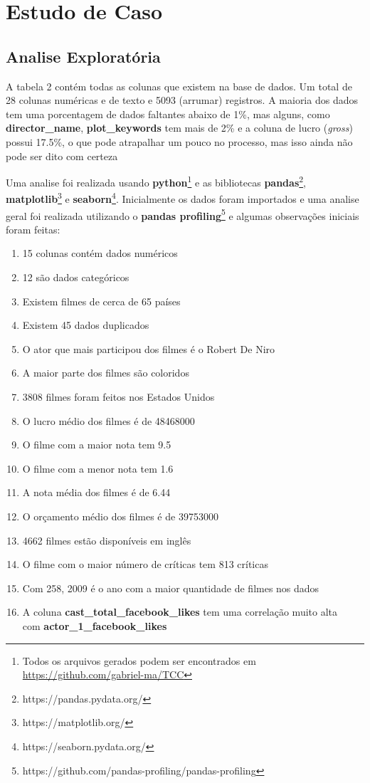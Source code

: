 \section{Estudo de Caso}
\subsection{Analise Exploratória}
A tabela 2 contém todas as colunas que existem na base de dados. Um total de 28 colunas numéricas e de texto e 5093 (arrumar) registros. A maioria dos dados tem uma porcentagem de dados faltantes abaixo de 1\%, mas alguns, como \textbf{director\_name}, \textbf{plot\_keywords} tem mais de 2\% e a coluna de lucro (\textit{gross}) possui 17.5\%, o que pode atrapalhar um pouco no processo, mas isso ainda não pode ser dito com certeza


Uma analise foi realizada usando \textbf{python}\footnote{Todos os arquivos gerados podem ser encontrados em \url{https://github.com/gabriel-ma/TCC}} e as bibliotecas \textbf{pandas}\footnote{https://pandas.pydata.org/}, \textbf{matplotlib}\footnote{https://matplotlib.org/} e \textbf{seaborn}\footnote{https://seaborn.pydata.org/}. Inicialmente os dados foram importados e uma analise geral foi realizada utilizando o \textbf{pandas profiling}\footnote{https://github.com/pandas-profiling/pandas-profiling} e algumas observações iniciais foram feitas:
\begin{enumerate}
    \item 15 colunas contém dados numéricos
    \item 12 são dados categóricos
    \item Existem filmes de cerca de 65 países
    \item Existem 45 dados duplicados
    \item O ator que mais participou dos filmes é o Robert De Niro 
    \item A maior parte dos filmes são coloridos
    \item 3808  filmes foram feitos nos Estados Unidos
    \item O lucro médio dos filmes é de 48468000
    \item O filme com a maior nota tem 9.5
    \item O filme com a menor nota tem 1.6
    \item A nota média dos filmes é de 6.44
    \item O orçamento médio dos filmes é de 39753000
    \item 4662 filmes estão disponíveis em inglês
    \item O filme com o maior número de críticas tem 813 críticas
    \item Com 258, 2009 é o ano com a maior quantidade de filmes nos dados
    \item A coluna \textbf{cast\_total\_facebook\_likes} tem uma correlação muito alta\\ com \textbf{actor\_1\_facebook\_likes}
\end{enumerate}

